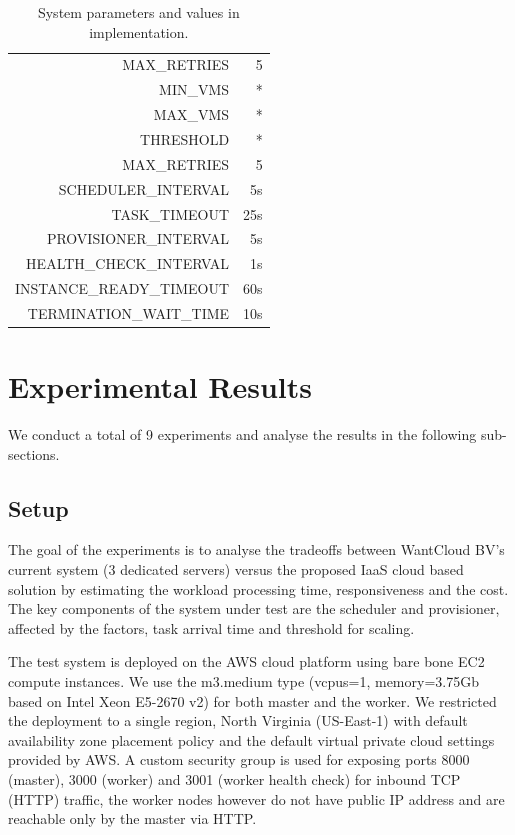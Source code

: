 \documentclass[a4paper]{IEEEtran}
\begin{document}
\begin{table}[tbp]
  \centering
  \caption{System parameters and values in implementation.}
  \label{table:system_params}
  \begin{tabular}{|r|r|}
    \hline
     MAX\_RETRIES & 5 \\
     MIN\_VMS & * \\
     MAX\_VMS & * \\
     THRESHOLD & * \\
     MAX\_RETRIES & 5 \\
     SCHEDULER\_INTERVAL & 5s \\
     TASK\_TIMEOUT & 25s \\
     PROVISIONER\_INTERVAL & 5s \\
     HEALTH\_CHECK\_INTERVAL & 1s \\
     INSTANCE\_READY\_TIMEOUT & 60s \\
     TERMINATION\_WAIT\_TIME & 10s \\
     \hline
  \end{tabular}
\end{table}

\section{Experimental Results} \label{experiments}

We conduct a total of 9 experiments and analyse the results in the following sub-sections.

\subsection{Setup}

The goal of the experiments is to analyse the tradeoffs between WantCloud BV's current 
system (3 dedicated servers) versus the proposed IaaS cloud based solution by estimating the workload
processing time, responsiveness and the cost. The key components of the system under test are the scheduler
and provisioner, affected by the factors, task arrival time and threshold for scaling.

The test system is deployed on the AWS cloud platform using bare bone EC2 compute instances. We
use the m3.medium type (vcpus=1, memory=3.75Gb based on Intel Xeon E5-2670 v2) for both master and the worker. 
We restricted the deployment to a single region, North Virginia (US-East-1) with default availability zone placement policy and the default 
virtual private cloud settings provided by AWS. A custom security group is used for exposing ports 8000 (master),
 3000 (worker) and 3001 (worker health check) for inbound TCP (HTTP) traffic, the worker nodes however do not 
 have public IP address and are reachable only by the master via HTTP.
\end{document}
